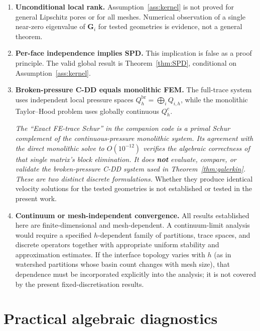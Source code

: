 \documentclass[11pt,a4paper]{article}
\newcommand{\DtN}{\mathbf{G}}
\begin{document}
\begin{enumerate}[leftmargin=*,itemsep=4pt]
  \item \textbf{Unconditional local rank.}
    Assumption~\ref{ass:kernel} is not proved for general Lipschitz pores
    or for all meshes.  Numerical observation of a single near-zero
    eigenvalue of $\DtN_i$ for tested geometries is evidence, not a
    general theorem.

  \item \textbf{Per-face independence implies SPD.}
    This implication is false as a proof principle.  The valid global
    result is Theorem~\ref{thm:SPD}, conditional on
    Assumption~\ref{ass:kernel}.

  \item \textbf{Broken-pressure C-DD equals monolithic FEM.}
    The full-trace system uses independent local pressure spaces
    $Q_h^{\text{br}} = \bigoplus_i Q_{i,h}$, while the monolithic
    Taylor--Hood problem uses globally continuous $Q_h^c$.

    \emph{The ``Exact FE-trace Schur'' in the companion code is a primal
    Schur complement of the continuous-pressure monolithic system.
    Its agreement with the direct monolithic solve to $O(10^{-12})$
    verifies the algebraic correctness of that single matrix's block
    elimination.  It does \textbf{not} evaluate, compare, or validate
    the broken-pressure C-DD system used in Theorem~\ref{thm:galerkin}.
    These are two distinct discrete formulations.}
    Whether they produce identical velocity solutions for the tested
    geometries is not established or tested in the present work.

  \item \textbf{Continuum or mesh-independent convergence.}
    All results established here are finite-dimensional and
    mesh-dependent.  A continuum-limit analysis would require a
    specified $h$-dependent family of partitions, trace spaces,
    and discrete operators together with appropriate uniform
    stability and approximation estimates.  If the interface
    topology varies with $h$ (as in watershed partitions whose
    basin count changes with mesh size), that dependence must be
    incorporated explicitly into the analysis; it is not covered
    by the present fixed-discretisation results.
\end{enumerate}

\section{Practical algebraic diagnostics}
\end{document}
